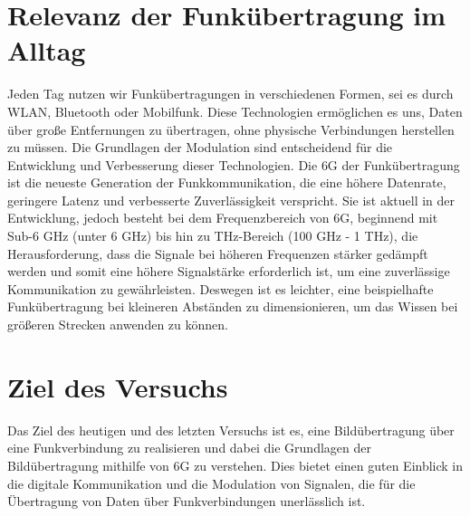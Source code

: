 \section{Relevanz der Funkübertragung im Alltag}
Jeden Tag nutzen wir Funkübertragungen in verschiedenen Formen, sei es durch WLAN, Bluetooth oder Mobilfunk. Diese Technologien ermöglichen es uns, Daten über große Entfernungen zu übertragen, ohne physische Verbindungen herstellen zu müssen. Die Grundlagen der Modulation sind entscheidend für die Entwicklung und Verbesserung dieser Technologien.
Die \ac{6G} der Funkübertragung ist die neueste Generation der Funkkommunikation, die eine höhere Datenrate, geringere Latenz und verbesserte Zuverlässigkeit verspricht. Sie ist aktuell in der Entwicklung, 
jedoch besteht bei dem Frequenzbereich von \ac{6G}, beginnend mit Sub-6 GHz (unter 6 GHz) bis hin zu THz-Bereich (100 GHz - 1 THz), 
die Herausforderung, dass die Signale bei höheren Frequenzen stärker gedämpft werden und somit eine höhere Signalstärke erforderlich ist, um eine zuverlässige Kommunikation zu gewährleisten.
Deswegen ist es leichter, eine beispielhafte Funkübertragung bei kleineren Abständen zu dimensionieren, um das Wissen bei größeren Strecken anwenden zu können.
\section{Ziel des Versuchs}
Das Ziel des heutigen und des letzten Versuchs ist es, eine Bildübertragung über eine Funkverbindung zu realisieren und dabei die Grundlagen der Bildübertragung mithilfe von 6G zu verstehen.
Dies bietet einen guten Einblick in die digitale Kommunikation und die Modulation von Signalen, die für die Übertragung von Daten über Funkverbindungen unerlässlich ist.
\clearpage 